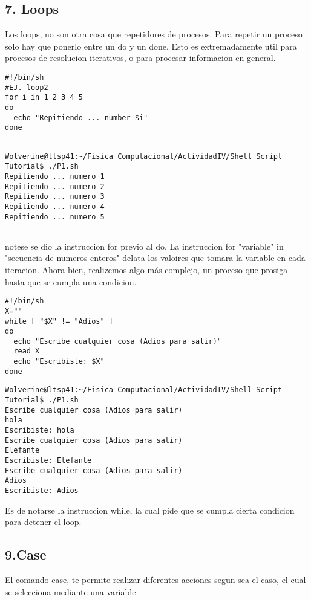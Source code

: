 \documentclass[a4paper]{article}
\begin{document}
\subsection{7. Loops}

Los loops, no son otra cosa que repetidores de procesos. Para repetir un proceso solo hay que ponerlo entre un do y un done. Esto es extremadamente util para procesos de resolucion iterativos, o para procesar informacion en general.

\begin{verbatim}
#!/bin/sh
#EJ. loop2
for i in 1 2 3 4 5
do
  echo "Repitiendo ... number $i"
done
\end{verbatim}


\begin{verbatim}

Wolverine@ltsp41:~/Fisica Computacional/ActividadIV/Shell Script Tutorial$ ./P1.sh
Repitiendo ... numero 1
Repitiendo ... numero 2
Repitiendo ... numero 3
Repitiendo ... numero 4
Repitiendo ... numero 5


\end{verbatim}

notese se dio la instruccion for previo al do. La instruccion for "variable" in "secuencia de numeros enteros" delata los valoires que tomara la variable en cada iteracion. Ahora bien, realizemos algo más complejo, un proceso que prosiga hasta que se cumpla una condicion. 

\begin{verbatim}
#!/bin/sh
X=""
while [ "$X" != "Adios" ]
do
  echo "Escribe cualquier cosa (Adios para salir)"
  read X
  echo "Escribiste: $X"
done
\end{verbatim}

\begin{verbatim}
Wolverine@ltsp41:~/Fisica Computacional/ActividadIV/Shell Script Tutorial$ ./P1.sh
Escribe cualquier cosa (Adios para salir)
hola
Escribiste: hola
Escribe cualquier cosa (Adios para salir)
Elefante
Escribiste: Elefante
Escribe cualquier cosa (Adios para salir)
Adios
Escribiste: Adios
\end{verbatim}

Es de notarse la instruccion while, la cual pide que se cumpla cierta condicion para detener el loop.

\subsection{9.Case}

El comando case, te permite realizar diferentes acciones segun sea el caso, el cual se selecciona mediante una variable.
\end{document}
